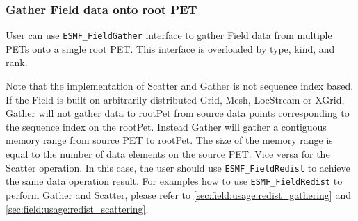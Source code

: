  
\setlength{\oldparskip}{\parskip}
\setlength{\parskip}{1.5ex}
\setlength{\oldparindent}{\parindent}
\setlength{\parindent}{0pt}
\setlength{\oldbaselineskip}{\baselineskip}
\setlength{\baselineskip}{11pt}
 
\def\bv{\begin{verbatim}}
\def\ev{\end{verbatim}}
\def\be{\begin{equation}}
\def\ee{\end{equation}}
\def\bea{\begin{eqnarray}}
\def\eea{\end{eqnarray}}
\def\bi{\begin{itemize}}
\def\ei{\end{itemize}}
\def\bn{\begin{enumerate}}
\def\en{\end{enumerate}}
\def\bd{\begin{description}}
\def\ed{\end{description}}
\def\({\left (}
\def\){\right )}
\def\[{\left [}
\def\]{\right ]}
\def\<{\left  \langle}
\def\>{\right \rangle}
\def\cI{{\cal I}}
\def\diag{\mathop{\rm diag}}
\def\tr{\mathop{\rm tr}}


 

   \subsubsection{Gather Field data onto root PET}
   \label{sec:field:usage:gather_2dptr}
  
   User can use {\tt ESMF\_FieldGather} interface to gather Field data from multiple
   PETs onto a single root PET. This interface is overloaded by type, kind, and rank.
  
   Note that the implementation of Scatter and Gather is not sequence index based.
   If the Field is built on arbitrarily distributed Grid, Mesh, LocStream or XGrid, 
   Gather will not gather data to rootPet 
   from source data points corresponding to the sequence index on the rootPet. 
   Instead Gather will gather a contiguous memory range from source PET to
   rootPet. The size of the memory range is equal to the number of 
   data elements on the source PET. Vice versa for the Scatter operation. 
   In this case, the user should use {\tt ESMF\_FieldRedist} to achieve
   the same data operation result. For examples how to use {\tt ESMF\_FieldRedist}
   to perform Gather and Scatter, please refer to
   \ref{sec:field:usage:redist_gathering} and
   \ref{sec:field:usage:redist_scattering}.
   
